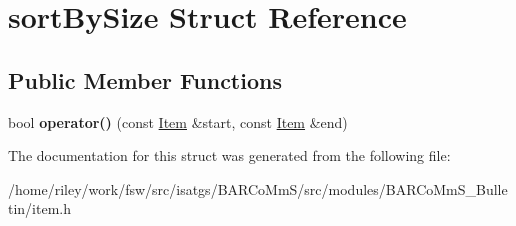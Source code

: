 \hypertarget{structsort_by_size}{}\section{sort\+By\+Size Struct Reference}
\label{structsort_by_size}
\subsection*{Public Member Functions}
\begin{DoxyCompactItemize}
\item 
bool {\bfseries operator()} (const \hyperlink{class_item}{Item} \&start, const \hyperlink{class_item}{Item} \&end)\hypertarget{structsort_by_size_aafa71dce1e956d3c36ed6b42b7167ffb}{}\label{structsort_by_size_aafa71dce1e956d3c36ed6b42b7167ffb}

\end{DoxyCompactItemize}


The documentation for this struct was generated from the following file\+:\begin{DoxyCompactItemize}
\item 
/home/riley/work/fsw/src/isatgs/\+B\+A\+R\+Co\+Mm\+S/src/modules/\+B\+A\+R\+Co\+Mm\+S\+\_\+\+Bulletin/item.\+h\end{DoxyCompactItemize}
